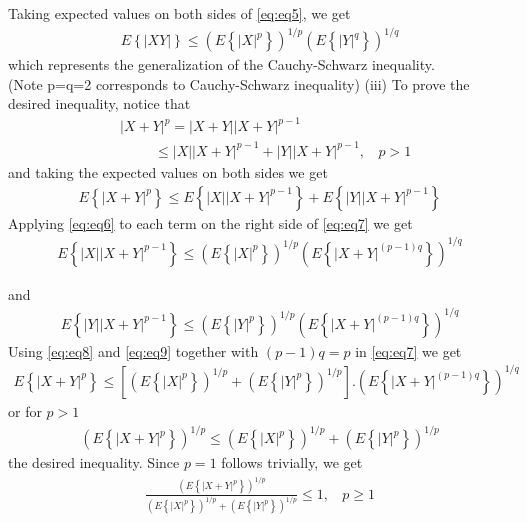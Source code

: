 \documentclass{beamer}
\providecommand{\sbrak}[1]{\ensuremath{{}\left[#1\right]}}
\providecommand{\brak}[1]{\ensuremath{\left(#1\right)}}
\providecommand{\cbrak}[1]{\ensuremath{\left\{#1\right\}}}
\theoremstyle{remark}
\numberwithin{equation}{section}
\numberwithin{figure}{section}
\numberwithin{table}{section}
\begin{document}
\begin{frame}
  Taking expected values on both sides of \eqref{eq:eq5}, we get
  \begin{align}
    E\cbrak{|XY|}\leq\brak{E\cbrak{|X|^p}}^{1/p}\brak{E\cbrak{|Y|^q}}^{1/q}
    \label{eq:eq6}
  \end{align}
  which represents the generalization of the Cauchy-Schwarz inequality.\\
  (Note p=q=2 corresponds to Cauchy-Schwarz inequality)
  (iii) To prove the desired inequality, notice that
  \begin{align*}
    &|X+Y|^p = |X+Y||X+Y|^{p-1}\\
    &~~~~~~~~~~~\leq|X||X+Y|^{p-1}+|Y||X+Y|^{p-1},~~~~p>1
  \end{align*}
  and taking the expected values on both sides we get
  \begin{align}
    E\cbrak{|X+Y|^p}\leq E\cbrak{|X||X+Y|^{p-1}}+ E\cbrak{|Y||X+Y|^{p-1}}
    \label{eq:eq7}
  \end{align}
  Applying \eqref{eq:eq6} to each term on the right side of \eqref{eq:eq7} we get
  \begin{align}
    E\cbrak{|X||X+Y|^{p-1}}\leq  \brak{E\cbrak{|X|^{p}}}^{1/p}\brak{E\cbrak{|X+Y|^{(p-1)q}}}^{1/q}
    \label{eq:eq8}
  \end{align}
\end{frame}
\begin{frame}
  and
  \begin{align}
    E\cbrak{|Y||X+Y|^{p-1}}\leq  \brak{E\cbrak{|Y|^{p}}}^{1/p}\brak{E\cbrak{|X+Y|^{(p-1)q}}}^{1/q}
    \label{eq:eq9}
  \end{align}
  Using \eqref{eq:eq8} and \eqref{eq:eq9} together with $(p-1)q = p$ in \eqref{eq:eq7} we get
  \begin{align*}
    E\cbrak{|X+Y|^p}\leq \sbrak{\brak{E\cbrak{|X|^{p}}}^{1/p}+\brak{E\cbrak{|Y|^{p}}}^{1/p}}.\brak{E\cbrak{|X+Y|^{(p-1)q}}}^{1/q}
  \end{align*}
  or for $p>1$
  \begin{align*}
    \brak{E\cbrak{|X+Y|^p}}^{1/p}\leq \brak{E\cbrak{|X|^{p}}}^{1/p}+\brak{E\cbrak{|Y|^{p}}}^{1/p}
  \end{align*}
  the desired inequality. Since $p=1$ follows trivially, we get
  \begin{align*}
    \frac{ \brak{E\cbrak{|X+Y|^p}}^{1/p}}{\brak{E\cbrak{|X|^{p}}}^{1/p}+\brak{E\cbrak{|Y|^{p}}}^{1/p}}\leq 1, ~~~~ p\geq 1
  \end{align*}
\end{frame}
\end{document}
